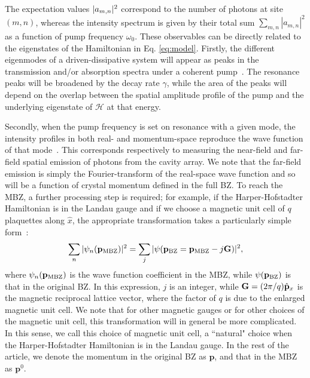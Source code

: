 The expectation values $\vert a_{m,n} \vert^2$ correspond to the number of photons
at site $(m,n)$, whereas the intensity spectrum is given by their
total sum $\sum_{m,n} |a_{m,n}|^2$ as a function of pump frequency
$\omega_0$. These observables can be directly related to the eigenstates of the Hamiltonian in Eq. \ref{eq:model}. Firstly, the different eigenmodes of a driven-dissipative system will appear as peaks in the transmission and/or absorption spectra under a coherent pump~\cite{carusotto2013fluids}. The resonance peaks will be broadened by the decay rate $\gamma$, while the area of the peaks will depend on the overlap between the spatial amplitude
profile of the pump and the underlying eigenstate of $\mathcal{H}$ at that energy. 

Secondly, when the pump frequency is set on resonance with a given mode, the intensity profiles in both real- and momentum-space reproduce the wave function of that mode~\cite{carusotto2013fluids}. This corresponds respectively to measuring the near-field and far-field spatial emission of photons from the cavity array. We note that the far-field emission is simply the Fourier-transform of the real-space wave function and so will be a function of crystal momentum defined in the full BZ. To reach the MBZ, a  further processing step is required; for example, if the Harper-Hofstadter Hamiltonian is in the Landau gauge and if we choose a magnetic unit cell of $q$ plaquettes along $\hat{x}$, the appropriate transformation takes a particularly simple form~\cite{price2014magnetic}:
%
\begin{equation} \label{eq:trans}
  \sum_n \vert \psi_n(\mathbf{p}_\mathrm{MBZ}) \vert^2 = \sum_j \vert \psi(\mathbf{p}_\mathrm{BZ} = \mathbf{p}_\mathrm{MBZ}- j\mathbf{G}) \vert^2 ,
\end{equation}
%
where $\psi_n(\mathbf{p}_\mathrm{MBZ})$ is the wave function coefficient in the MBZ, while $\psi(\mathbf{p}_\mathrm{BZ})$ is that in the original BZ. In this expression, $j$ is an integer, while $\mathbf{G} = (2\pi/q) \hat{\mathbf{p}}_x $ is the magnetic reciprocal lattice vector, where the factor of $q$ is due to the enlarged magnetic unit cell. We note that for other magnetic gauges or for other choices of the magnetic unit cell, this transformation will in general be more complicated. In this sense, we call this choice of magnetic unit cell, a ``natural" choice when the Harper-Hofstadter Hamiltonian is in the Landau gauge.
In the rest of the article, we denote the momentum in the original BZ as $\mathbf{p}$, and that in the MBZ as $\mathbf{p}^0$.

